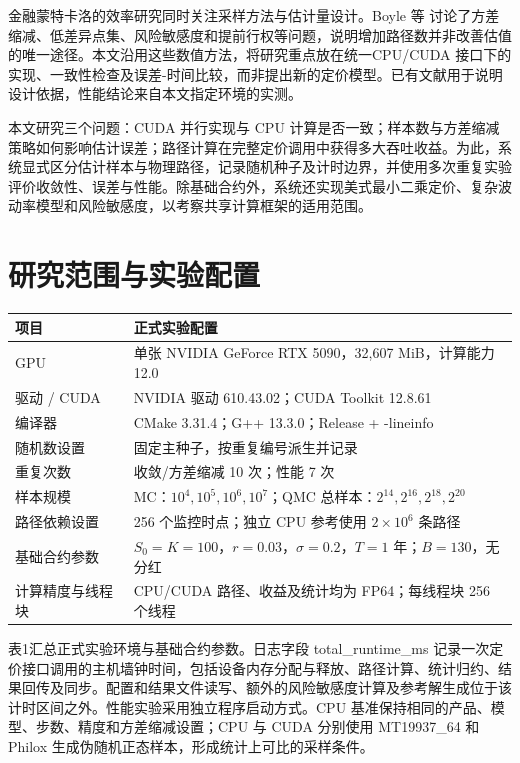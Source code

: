 \documentclass[UTF8,a4paper,zihao=5,fontset=none]{ctexart}
\begin{document}
金融蒙特卡洛的效率研究同时关注采样方法与估计量设计。Boyle 等 \cite{r12}讨论了方差缩减、低差异点集、风险敏感度和提前行权等问题，说明增加路径数并非改善估值的唯一途径。本文沿用这些数值方法，将研究重点放在统一CPU/CUDA 接口下的实现、一致性检查及误差-时间比较，而非提出新的定价模型。已有文献用于说明设计依据，性能结论来自本文指定环境的实测。


本文研究三个问题：CUDA 并行实现与 CPU 计算是否一致；样本数与方差缩减策略如何影响估计误差；路径计算在完整定价调用中获得多大吞吐收益。为此，系统显式区分估计样本与物理路径，记录随机种子及计时边界，并使用多次重复实验评价收敛性、误差与性能。除基础合约外，系统还实现美式最小二乘定价、复杂波动率模型和风险敏感度，以考察共享计算框架的适用范围。


\section{研究范围与实验配置}

\par\medskip\noindent\begin{minipage}{\linewidth}
\small
{}\label{tab:1}
\begin{tabular}{@{}P{41.389mm}P{117.799mm}@{}}
\toprule
\textbf{项目} & \textbf{正式实验配置} \\
\midrule
GPU & 单张 NVIDIA GeForce RTX 5090，32,607 MiB，计算能力 12.0 \\
驱动 / CUDA & NVIDIA 驱动 610.43.02；CUDA Toolkit 12.8.61 \\
编译器 & CMake 3.31.4；G++ 13.3.0；Release + {\small\ttfamily -\allowbreak{}lineinfo} \\
随机数设置 & 固定主种子，按重复编号派生并记录 \\
重复次数 & 收敛/方差缩减 10 次；性能 7 次 \\
样本规模 & MC：$10^4,10^5,10^6,10^7$；QMC 总样本：$2^{14},2^{16},2^{18},2^{20}$ \\
路径依赖设置 & 256 个监控时点；独立 CPU 参考使用 $2\times10^6$ 条路径 \\
基础合约参数 & $S_0=K=100$，$r=0.03$，$\sigma=0.2$，$T=1$ 年；$B=130$，无分红 \\
计算精度与线程块 & CPU/CUDA 路径、收益及统计均为 FP64；每线程块 256 个线程 \\
\bottomrule
\end{tabular}
\end{minipage}\par\medskip

表1汇总正式实验环境与基础合约参数。日志字段 {\small\ttfamily total\_\allowbreak{}ru\allowbreak{}ntime\_\allowbreak{}ms\allowbreak{}} 记录一次定价接口调用的主机墙钟时间，包括设备内存分配与释放、路径计算、统计归约、结果回传及同步。配置和结果文件读写、额外的风险敏感度计算及参考解生成位于该计时区间之外。性能实验采用独立程序启动方式。CPU 基准保持相同的产品、模型、步数、精度和方差缩减设置；CPU 与 CUDA 分别使用 MT19937\_64 和Philox 生成伪随机正态样本，形成统计上可比的采样条件。
\end{document}
